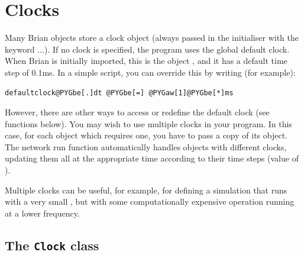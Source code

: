 \documentclass[letterpaper,10pt]{manual}
\begin{document}
\hypertarget{index-63}{}\section{Clocks}
Many Brian objects store a clock object (always passed in the
initialiser with the keyword ...). If no clock is specified,
the program uses the global default clock. When Brian is initially
imported, this is the object \hyperlink{brian.defaultclock}{}, and it has a default
time step of 0.1ms. In a simple script, you can override this by
writing (for example):

\begin{Verbatim}[commandchars=@\[\]]
defaultclock@PYGbe[.]dt @PYGbe[=] @PYGaw[1]@PYGbe[*]ms
\end{Verbatim}

However, there are other ways to access or redefine the default
clock (see functions below).
You may wish to use multiple clocks in your program. In this case,
for each object which requires one, you have to pass a copy of its
\hyperlink{brian.Clock}{} object. The network run function automatically handles objects
with different clocks, updating them all at the appropriate time
according to their time steps (value of \hyperlink{brian.Clock.dt}{}).

Multiple clocks can be useful, for example, for defining a simulation
that runs with a very small , but with some computationally
expensive operation running at a lower frequency.


\subsection{The \texttt{Clock} class}
\end{document}
